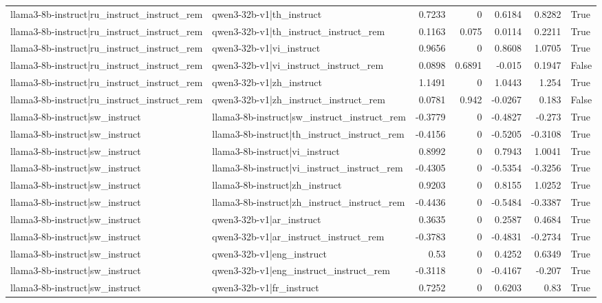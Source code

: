 \begin{table}
\begin{tabular}{l l r r r r l}
llama3-8b-instruct|ru_instruct_instruct_rem & qwen3-32b-v1|th_instruct & 0.7233 & 0 & 0.6184 & 0.8282 & True \\
llama3-8b-instruct|ru_instruct_instruct_rem & qwen3-32b-v1|th_instruct_instruct_rem & 0.1163 & 0.075 & 0.0114 & 0.2211 & True \\
llama3-8b-instruct|ru_instruct_instruct_rem & qwen3-32b-v1|vi_instruct & 0.9656 & 0 & 0.8608 & 1.0705 & True \\
llama3-8b-instruct|ru_instruct_instruct_rem & qwen3-32b-v1|vi_instruct_instruct_rem & 0.0898 & 0.6891 & -0.015 & 0.1947 & False \\
llama3-8b-instruct|ru_instruct_instruct_rem & qwen3-32b-v1|zh_instruct & 1.1491 & 0 & 1.0443 & 1.254 & True \\
llama3-8b-instruct|ru_instruct_instruct_rem & qwen3-32b-v1|zh_instruct_instruct_rem & 0.0781 & 0.942 & -0.0267 & 0.183 & False \\
llama3-8b-instruct|sw_instruct & llama3-8b-instruct|sw_instruct_instruct_rem & -0.3779 & 0 & -0.4827 & -0.273 & True \\
llama3-8b-instruct|sw_instruct & llama3-8b-instruct|th_instruct_instruct_rem & -0.4156 & 0 & -0.5205 & -0.3108 & True \\
llama3-8b-instruct|sw_instruct & llama3-8b-instruct|vi_instruct & 0.8992 & 0 & 0.7943 & 1.0041 & True \\
llama3-8b-instruct|sw_instruct & llama3-8b-instruct|vi_instruct_instruct_rem & -0.4305 & 0 & -0.5354 & -0.3256 & True \\
llama3-8b-instruct|sw_instruct & llama3-8b-instruct|zh_instruct & 0.9203 & 0 & 0.8155 & 1.0252 & True \\
llama3-8b-instruct|sw_instruct & llama3-8b-instruct|zh_instruct_instruct_rem & -0.4436 & 0 & -0.5484 & -0.3387 & True \\
llama3-8b-instruct|sw_instruct & qwen3-32b-v1|ar_instruct & 0.3635 & 0 & 0.2587 & 0.4684 & True \\
llama3-8b-instruct|sw_instruct & qwen3-32b-v1|ar_instruct_instruct_rem & -0.3783 & 0 & -0.4831 & -0.2734 & True \\
llama3-8b-instruct|sw_instruct & qwen3-32b-v1|eng_instruct & 0.53 & 0 & 0.4252 & 0.6349 & True \\
llama3-8b-instruct|sw_instruct & qwen3-32b-v1|eng_instruct_instruct_rem & -0.3118 & 0 & -0.4167 & -0.207 & True \\
llama3-8b-instruct|sw_instruct & qwen3-32b-v1|fr_instruct & 0.7252 & 0 & 0.6203 & 0.83 & True \\

\end{tabular}
\end{table}

